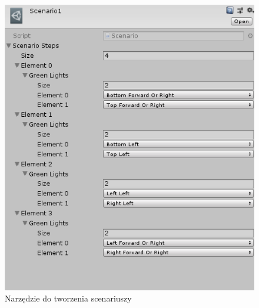 \begin{figure}
	\centering
	\includegraphics[width=0.8\linewidth]{ap8}
	\caption[Narzędzie do tworzenia scenariuszy]{Narzędzie do tworzenia scenariuszy}
	\label{fig:ap8}
\end{figure}



